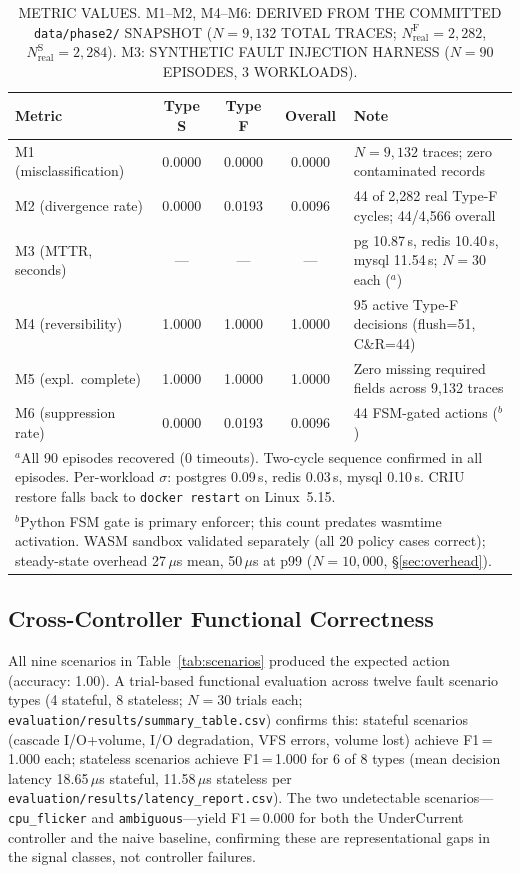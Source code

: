 \documentclass[conference]{IEEEtran}
\begin{document}
\begin{table}[!t]
\caption{METRIC VALUES. M1--M2, M4--M6: DERIVED FROM THE COMMITTED \texttt{data/phase2/} SNAPSHOT ($N = 9{,}132$ TOTAL TRACES; $N_{\mathrm{real}}^{\mathrm{F}} = 2{,}282$, $N_{\mathrm{real}}^{\mathrm{S}} = 2{,}284$). M3: SYNTHETIC FAULT INJECTION HARNESS ($N = 90$ EPISODES, 3 WORKLOADS).}
\label{tab:metrics}
\centering
\renewcommand{\arraystretch}{1.15}
\begin{tabular}{lcccp{5.5cm}}
\hline
\textbf{Metric} & \textbf{Type S} & \textbf{Type F} & \textbf{Overall} & \textbf{Note} \\
\hline
M1 (misclassification)  & 0.0000 & 0.0000 & 0.0000 & $N = 9{,}132$ traces; zero contaminated records \\
M2 (divergence rate)    & 0.0000 & 0.0193 & 0.0096 & 44 of 2{,}282 real Type-F cycles; 44/4{,}566 overall \\
M3 (MTTR, seconds)      & ---    & ---    & ---    & pg 10.87\,s, redis 10.40\,s, mysql 11.54\,s; $N=30$ each ($^{a}$) \\
M4 (reversibility)      & 1.0000 & 1.0000 & 1.0000 & 95 active Type-F decisions (flush=51, C\&R=44) \\
M5 (expl.\ complete)    & 1.0000 & 1.0000 & 1.0000 & Zero missing required fields across 9{,}132 traces \\
M6 (suppression rate)   & 0.0000 & 0.0193 & 0.0096 & 44 FSM-gated actions ($^{b}$) \\
\hline
\multicolumn{5}{l}{\footnotesize $^{a}$All 90 episodes recovered (0 timeouts). Two-cycle sequence confirmed in all episodes. Per-workload $\sigma$: postgres 0.09\,s, redis 0.03\,s, mysql 0.10\,s. CRIU restore falls back to \texttt{docker restart} on Linux~5.15.}\\
\multicolumn{5}{l}{\footnotesize $^{b}$Python FSM gate is primary enforcer; this count predates wasmtime activation. WASM sandbox validated separately (all 20 policy cases correct); steady-state overhead 27\,$\mu$s mean, 50\,$\mu$s at p99 ($N = 10{,}000$, §\ref{sec:overhead}).}
\end{tabular}
\end{table}

\subsection{Cross-Controller Functional Correctness}

All nine scenarios in Table~\ref{tab:scenarios} produced the expected action (accuracy: 1.00). A trial-based functional evaluation across twelve fault scenario types (4 stateful, 8 stateless; $N = 30$ trials each; \texttt{evaluation/results/summary\_table.csv}) confirms this: stateful scenarios (cascade I/O+volume, I/O degradation, VFS errors, volume lost) achieve F1\,=\,1.000 each; stateless scenarios achieve F1\,=\,1.000 for 6 of 8 types (mean decision latency 18.65\,$\mu$s stateful, 11.58\,$\mu$s stateless per \texttt{evaluation/results/latency\_report.csv}). The two undetectable scenarios---\texttt{cpu\_flicker} and \texttt{ambiguous}---yield F1\,=\,0.000 for both the UnderCurrent controller and the naive baseline, confirming these are representational gaps in the signal classes, not controller failures.
\end{document}
